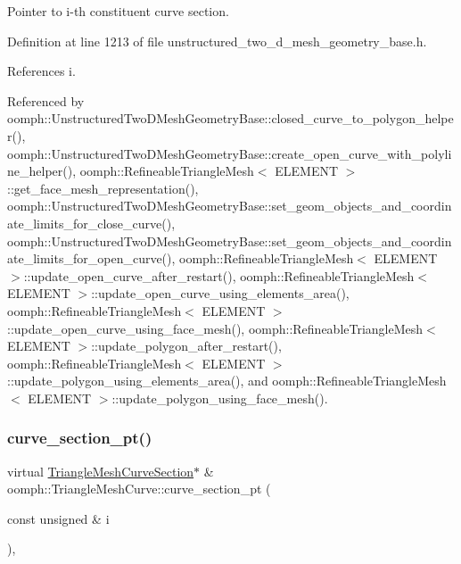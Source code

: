 Pointer to i-\/th constituent curve section. 



Definition at line 1213 of file unstructured\+\_\+two\+\_\+d\+\_\+mesh\+\_\+geometry\+\_\+base.\+h.



References i.



Referenced by oomph\+::\+Unstructured\+Two\+D\+Mesh\+Geometry\+Base\+::closed\+\_\+curve\+\_\+to\+\_\+polygon\+\_\+helper(), oomph\+::\+Unstructured\+Two\+D\+Mesh\+Geometry\+Base\+::create\+\_\+open\+\_\+curve\+\_\+with\+\_\+polyline\+\_\+helper(), oomph\+::\+Refineable\+Triangle\+Mesh$<$ E\+L\+E\+M\+E\+N\+T $>$\+::get\+\_\+face\+\_\+mesh\+\_\+representation(), oomph\+::\+Unstructured\+Two\+D\+Mesh\+Geometry\+Base\+::set\+\_\+geom\+\_\+objects\+\_\+and\+\_\+coordinate\+\_\+limits\+\_\+for\+\_\+close\+\_\+curve(), oomph\+::\+Unstructured\+Two\+D\+Mesh\+Geometry\+Base\+::set\+\_\+geom\+\_\+objects\+\_\+and\+\_\+coordinate\+\_\+limits\+\_\+for\+\_\+open\+\_\+curve(), oomph\+::\+Refineable\+Triangle\+Mesh$<$ E\+L\+E\+M\+E\+N\+T $>$\+::update\+\_\+open\+\_\+curve\+\_\+after\+\_\+restart(), oomph\+::\+Refineable\+Triangle\+Mesh$<$ E\+L\+E\+M\+E\+N\+T $>$\+::update\+\_\+open\+\_\+curve\+\_\+using\+\_\+elements\+\_\+area(), oomph\+::\+Refineable\+Triangle\+Mesh$<$ E\+L\+E\+M\+E\+N\+T $>$\+::update\+\_\+open\+\_\+curve\+\_\+using\+\_\+face\+\_\+mesh(), oomph\+::\+Refineable\+Triangle\+Mesh$<$ E\+L\+E\+M\+E\+N\+T $>$\+::update\+\_\+polygon\+\_\+after\+\_\+restart(), oomph\+::\+Refineable\+Triangle\+Mesh$<$ E\+L\+E\+M\+E\+N\+T $>$\+::update\+\_\+polygon\+\_\+using\+\_\+elements\+\_\+area(), and oomph\+::\+Refineable\+Triangle\+Mesh$<$ E\+L\+E\+M\+E\+N\+T $>$\+::update\+\_\+polygon\+\_\+using\+\_\+face\+\_\+mesh().

\mbox{\label{classoomph_1_1TriangleMeshCurve_aadac04c87e2db2235bb39ee10b11f5be}} 
\subsubsection{\texorpdfstring{curve\+\_\+section\+\_\+pt()}{curve\_section\_pt()}\hspace{0.1cm}{\footnotesize\ttfamily [2/2]}}
{\footnotesize\ttfamily virtual \hyperlink{classoomph_1_1TriangleMeshCurveSection}{Triangle\+Mesh\+Curve\+Section}$\ast$ \& oomph\+::\+Triangle\+Mesh\+Curve\+::curve\+\_\+section\+\_\+pt (\begin{DoxyParamCaption}\item[{const unsigned \&}]{i }\end{DoxyParamCaption})\hspace{0.3cm}{\ttfamily [inline]}, {\ttfamily [virtual]}}



